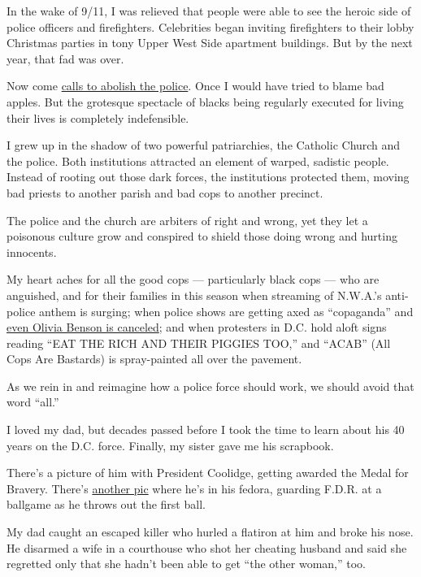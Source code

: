 In the wake of 9/11, I was relieved that people were able to see the
heroic side of police officers and firefighters. Celebrities began
inviting firefighters to their lobby Christmas parties in tony Upper
West Side apartment buildings. But by the next year, that fad was over.

Now come
\href{https://www.nytimes.com/2020/06/12/opinion/sunday/floyd-abolish-defund-police.html}{calls
to abolish the police}. Once I would have tried to blame bad apples. But
the grotesque spectacle of blacks being regularly executed for living
their lives is completely indefensible.

I grew up in the shadow of two powerful patriarchies, the Catholic
Church and the police. Both institutions attracted an element of warped,
sadistic people. Instead of rooting out those dark forces, the
institutions protected them, moving bad priests to another parish and
bad cops to another precinct.

The police and the church are arbiters of right and wrong, yet they let
a poisonous culture grow and conspired to shield those doing wrong and
hurting innocents.

My heart aches for all the good cops --- particularly black cops --- who
are anguished, and for their families in this season when streaming of
N.W.A.'s anti-police anthem is surging; when police shows are getting
axed as ``copaganda'' and
\href{https://www.rollingstone.com/culture/culture-features/olivia-benson-svu-mariska-hargitay-canceled-cops-1014181/}{even
Olivia Benson is canceled}; and when protesters in D.C. hold aloft signs
reading ``EAT THE RICH AND THEIR PIGGIES TOO,'' and ``ACAB'' (All Cops
Are Bastards) is spray-painted all over the pavement.

As we rein in and reimagine how a police force should work, we should
avoid that word ``all.''

I loved my dad, but decades passed before I took the time to learn about
his 40 years on the D.C. force. Finally, my sister gave me his
scrapbook.

There's a picture of him with President Coolidge, getting awarded the
Medal for Bravery. There's
\href{https://www.instagram.com/p/B4DnolcA85U/}{another pic} where he's
in his fedora, guarding F.D.R. at a ballgame as he throws out the first
ball.

My dad caught an escaped killer who hurled a flatiron at him and broke
his nose. He disarmed a wife in a courthouse who shot her cheating
husband and said she regretted only that she hadn't been able to get
``the other woman,'' too.

